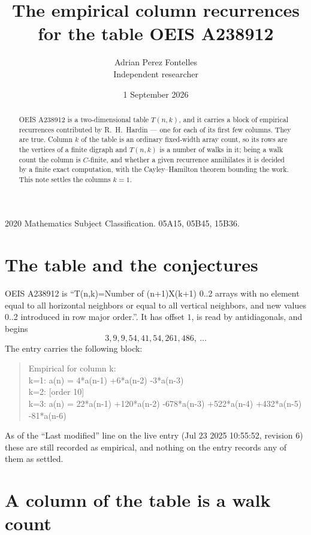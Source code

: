 \documentclass[11pt,a4paper]{article}
\title{The empirical column recurrences for the table OEIS A238912}
\author{Adrian Perez Fontelles\\ \small Independent researcher}
\date{1 September 2026}
\theoremstyle{plain}
\theoremstyle{definition}
\begin{document}
\maketitle

\begin{abstract}
OEIS A238912 is a two-dimensional table $T(n,k)$, and it carries a block of empirical
recurrences contributed by R.~H.~Hardin --- one for each of its first few columns. They are
true. Column $k$ of the table is an ordinary fixed-width array count, so its rows are the
vertices of a finite digraph and $T(n,k)$ is a number of walks in it; being a walk count the
column is $C$-finite, and whether a given recurrence annihilates it is decided by a finite
exact computation, with the Cayley--Hamilton theorem bounding the work. This note settles the columns $k=1$.
\end{abstract}

\noindent\small 2020 Mathematics Subject Classification. 05A15, 05B45, 15B36.\normalsize

\section{The table and the conjectures}

OEIS A238912 is ``T(n,k)=Number of (n+1)X(k+1) 0..2 arrays with no element equal to all horizontal neighbors or equal to all vertical neighbors, and new values 0..2 introduced in row major order.''. It has offset $1$, is
read by antidiagonals, and begins
\[
3, 9, 9, 54, 41, 54, 261, 486,\ \dots
\]
The entry carries the following block:
\begin{quote}\small
Empirical for column k:\\
k=1: a(n) = 4*a(n-1) +6*a(n-2) -3*a(n-3)\\
k=2: [order 10]\\
k=3: a(n) = 22*a(n-1) +120*a(n-2) -678*a(n-3) +522*a(n-4) +432*a(n-5) -81*a(n-6)\\
\end{quote}
As of the ``Last modified'' line on the live entry (Jul 23 2025 10:55:52, revision 6) these are still
recorded as empirical, and nothing on the entry records any of them as settled.

\section{A column of the table is a walk count}
\end{document}

